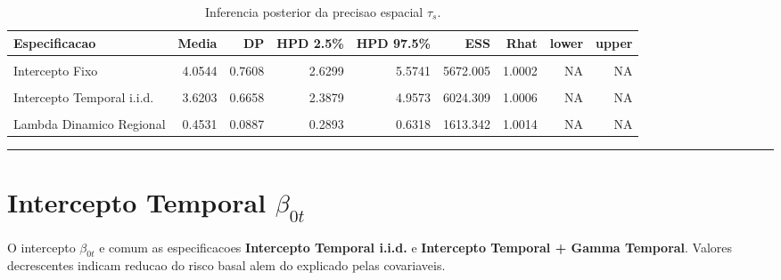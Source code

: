 \documentclass[
]{article}
\begin{document}
\begin{longtable}[t]{lrrrrrrrr}
\caption{\label{tab:tab-tau}Inferencia posterior da precisao espacial $\tau_s$.}\\
\toprule
Especificacao & Media & DP & HPD 2.5\% & HPD 97.5\% & ESS & Rhat & lower & upper\\
\midrule
\cellcolor{gray!10}{Gamma Temporal} & \cellcolor{gray!10}{5.3260} & \cellcolor{gray!10}{1.0488} & \cellcolor{gray!10}{3.4101} & \cellcolor{gray!10}{7.4137} & \cellcolor{gray!10}{2498.105} & \cellcolor{gray!10}{1.0001} & \cellcolor{gray!10}{NA} & \cellcolor{gray!10}{NA}\\
\cmidrule{1-9}\pagebreak[0]
Intercepto Fixo & 4.0544 & 0.7608 & 2.6299 & 5.5741 & 5672.005 & 1.0002 & NA & NA\\
\cmidrule{1-9}\pagebreak[0]
\cellcolor{gray!10}{Intercepto Temporal + Gamma Temporal} & \cellcolor{gray!10}{5.2841} & \cellcolor{gray!10}{1.0118} & \cellcolor{gray!10}{NA} & \cellcolor{gray!10}{NA} & \cellcolor{gray!10}{3743.729} & \cellcolor{gray!10}{1.0017} & \cellcolor{gray!10}{3.4311} & \cellcolor{gray!10}{7.2882}\\
\cmidrule{1-9}\pagebreak[0]
Intercepto Temporal i.i.d. & 3.6203 & 0.6658 & 2.3879 & 4.9573 & 6024.309 & 1.0006 & NA & NA\\
\cmidrule{1-9}\pagebreak[0]
\cellcolor{gray!10}{Lambda Compartilhado} & \cellcolor{gray!10}{9.3723} & \cellcolor{gray!10}{1.8226} & \cellcolor{gray!10}{5.8360} & \cellcolor{gray!10}{12.9333} & \cellcolor{gray!10}{6171.929} & \cellcolor{gray!10}{1.0002} & \cellcolor{gray!10}{NA} & \cellcolor{gray!10}{NA}\\
\cmidrule{1-9}\pagebreak[0]
Lambda Dinamico Regional & 0.4531 & 0.0887 & 0.2893 & 0.6318 & 1613.342 & 1.0014 & NA & NA\\
\bottomrule
\end{longtable}
\endgroup{}

\begin{center}\rule{0.5\linewidth}{0.5pt}\end{center}

\section{\texorpdfstring{Intercepto Temporal
\(\beta_{0t}\)}{Intercepto Temporal \textbackslash beta\_\{0t\}}}\label{intercepto-temporal-beta_0t}

O intercepto \(\beta_{0t}\) e comum as especificacoes \textbf{Intercepto
Temporal i.i.d.} e \textbf{Intercepto Temporal + Gamma Temporal}.
Valores decrescentes indicam reducao do risco basal alem do explicado
pelas covariaveis.
\end{document}
